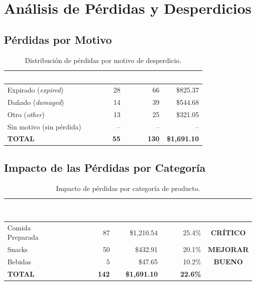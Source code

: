\documentclass[12pt,letterpaper]{article}
\begin{document}
\newpage
\section{Análisis de Pérdidas y Desperdicios}

\subsection{Pérdidas por Motivo}

\begin{table}[H]
\centering
{}
\begin{tabular}{l r r r}
\toprule
\rowcolor{tabheader}
\textcolor{white}{\textbf{Motivo}} &
\textcolor{white}{\textbf{Registros}} &
\textcolor{white}{\textbf{Unidades}} &
\textcolor{white}{\textbf{Costo (\$)}} \\
\midrule
Expirado (\textit{expired})   & 28 & 66 & \$825.37 \\
Dañado (\textit{damaged})     & 14 & 39 & \$544.68 \\
Otro (\textit{other})         & 13 & 25 & \$321.05 \\
Sin motivo (sin pérdida)      & -- & -- & -- \\
\midrule
\textbf{TOTAL}                & \textbf{55} & \textbf{130} & \textbf{\$1,691.10} \\
\bottomrule
\end{tabular}
\caption{Distribución de pérdidas por motivo de desperdicio.}
\end{table}

\subsection{Impacto de las Pérdidas por Categoría}

\begin{table}[H]
\centering
{}
\begin{tabular}{l r r r c}
\toprule
\rowcolor{tabheader}
\textcolor{white}{\textbf{Categoría}} &
\textcolor{white}{\textbf{Uds.\ Perdidas}} &
\textcolor{white}{\textbf{Costo Pérdida}} &
\textcolor{white}{\textbf{Tasa Pérdida}} &
\textcolor{white}{\textbf{Estado}} \\
\midrule
Comida Preparada & 87  & \$1,210.54 & 25.4\% & \textcolor{danger}{\textbf{CRÍTICO}} \\
Snacks           & 50  & \$432.91   & 20.1\% & \textcolor{warning}{\textbf{MEJORAR}} \\
Bebidas          &  5  & \$47.65    & 10.2\% & \textcolor{success}{\textbf{BUENO}} \\
\midrule
\textbf{TOTAL}   & \textbf{142} & \textbf{\$1,691.10} & \textbf{22.6\%} & \\
\bottomrule
\end{tabular}
\caption{Impacto de pérdidas por categoría de producto.}
\end{table}
\end{document}
